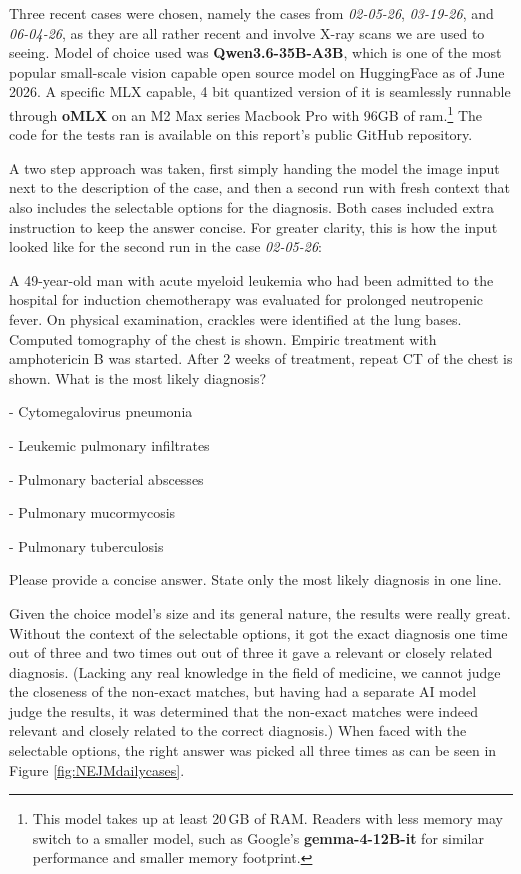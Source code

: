\documentclass{imc-inf}
\begin{document}
Three recent cases were chosen, namely the cases from \textit{02-05-26}, \textit{03-19-26}, and \textit{06-04-26}, as they are all rather recent and involve X-ray scans we are used to seeing.
Model of choice used was \textbf{Qwen3.6-35B-A3B}, which is one of the most popular small-scale vision capable open source model on HuggingFace as of June 2026\cite{huggingfaceqwen362026}.
A specific MLX capable, 4 bit quantized version of it is seamlessly runnable through \textbf{oMLX} on an M2 Max series Macbook Pro with 96GB of ram.\footnote{This model takes up at least 20\,GB of RAM. Readers with less memory may switch to a smaller model, such as Google's \textbf{gemma-4-12B-it} for similar performance and smaller memory footprint.}
The code for the tests ran is available on this report's public GitHub repository\cite{repoS2IPBM6MOD2026}.

A two step approach was taken, first simply handing the model the image input next to the description of the case, and then a second run with fresh context that also includes the selectable options for the diagnosis. Both cases included extra instruction to keep the answer concise.
For greater clarity, this is how the input looked like for the second run in the case \textit{02-05-26}:

\begin{displayquote}
    A 49-year-old man with acute myeloid leukemia who had been admitted to the hospital for induction chemotherapy was evaluated for prolonged neutropenic fever.
	On physical examination, crackles were identified at the lung bases. Computed tomography of the chest is shown.
	Empiric treatment with amphotericin B was started. After 2 weeks of treatment, repeat CT of the chest is shown.
	What is the most likely diagnosis?

	- Cytomegalovirus pneumonia

	- Leukemic pulmonary infiltrates

	- Pulmonary bacterial abscesses

	- Pulmonary mucormycosis

	- Pulmonary tuberculosis

	Please provide a concise answer.
    State only the most likely diagnosis in one line.
\end{displayquote}

Given the choice model's size and its general nature, the results were really great.
Without the context of the selectable options, it got the exact diagnosis one time out of three and two times out out of three it gave a relevant or closely related diagnosis.
(Lacking any real knowledge in the field of medicine, we cannot judge the closeness of the non-exact matches, but having had a separate AI model judge the results, it was determined that the non-exact matches were indeed relevant and closely related to the correct diagnosis.)
When faced with the selectable options, the right answer was picked all three times as can be seen in Figure \ref{fig:NEJMdailycases}.
\end{document}
